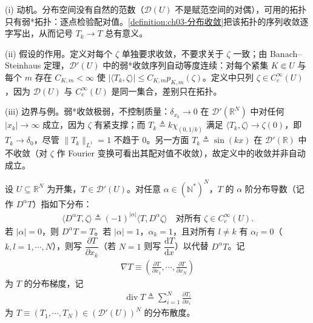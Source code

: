 \documentclass[../../main.tex]{subfiles}%
\begin{document}
\begin{remark}\label{remark:ch03-分布收敛动机}
(i) 动机。分布空间没有自然的范数（$\mathcal{D}(U)$ 不是赋范空间的对偶），可用的拓扑只有弱*拓扑：逐点检验配对值。\cref{definition:ch03-分布收敛}把该拓扑的序列收敛逐字写出，从而记号 $T_k\to T$ 总有意义。

(ii) 假设的作用。定义对每个 $\zeta$ 单独要求收敛，不要求关于 $\zeta$ 一致；由 Banach--Steinhaus 定理，$\mathcal{D}'(U)$ 中的弱*收敛序列自动等度连续：对每个紧集 $K\Subset U$ 与每个 $m$ 存在 $C_{K,m}<\infty$ 使 $|\langle T_k,\zeta\rangle|\leqslant C_{K,m}p_{K,m}(\zeta)$。定义中只列 $\zeta\in C^\infty_c(U)$，因为 $\mathcal{D}(U)$ 与 $C^\infty_c(U)$ 是同一集合，差别只在拓扑。

(iii) 边界与例。弱*收敛极弱，不控制质量：$\delta_{x_k}\to0$ 在 $\mathcal{D}'(\mathbb{R}^N)$ 中对任何 $|x_k|\to\infty$ 成立，因为 $\zeta$ 有紧支撑；而 $T_k\triangleq k\chi_{(0,1/k)}$ 满足 $\langle T_k,\zeta\rangle\to\zeta(0)$，即 $T_k\to\delta_0$，尽管 $\|T_k\|_{L^1}=1$ 不趋于 $0$。另一方面 $T_k\triangleq\sin(kx)$ 在 $\mathcal{D}'(\mathbb{R})$ 中不收敛（对 $\zeta$ 作 Fourier 变换可看出其配对值不收敛），故定义中的收敛并非自动成立。
\end{remark}

\begin{definition}\label{definition:ch03-分布导数定义}
设 $U\subseteq\mathbb{R}^N$ 为开集，$T\in\mathcal{D}'(U)$。对任意 $\alpha\in(\mathbb{N}^*)^N$，$T$ 的 $\alpha$ 阶分布导数（记作 $D^\alpha T$）指如下分布：
\begin{align*}
\langle D^\alpha T,\zeta\rangle \triangleq  (-1)^{|\alpha|}\langle T,D^\alpha\zeta\rangle
\quad \text{对所有 }\zeta\in C^\infty_c(U).
\end{align*}
若 $|\alpha|=0$，则 $D^\alpha T=T$。若 $|\alpha|=1$，$\alpha_k=1$，且对所有 $l\neq k$ 有 $\alpha_l=0$（$k,l=1,\cdots ,N$），则写 $\dfrac{\partial T}{\partial x_k}$（若 $N=1$ 则写 $\dfrac{\mathrm{d}T}{\mathrm{d}x}$）以代替 $D^\alpha T$。记
\begin{align*}
\nabla T\equiv\left(\frac{\partial T}{\partial x_1},\cdots ,\frac{\partial T}{\partial x_N}\right)
\end{align*}
为 $T$ 的分布梯度，记
\begin{align*}
\operatorname{div}T \triangleq  \sum_{i=1}^N\frac{\partial T_i}{\partial x_i}
\end{align*}
为 $T\equiv(T_1,\cdots ,T_N)\in(\mathcal{D}'(U))^N$ 的分布散度。
\end{definition}
\end{document}
